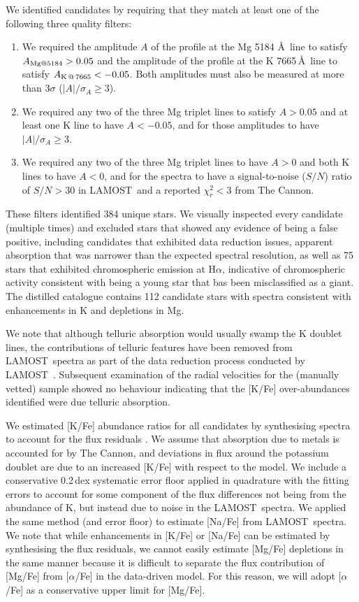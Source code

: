 \documentclass[a4paper,fleqn,usenatbib]{mnras}
\newcommand{\project}[1]{#1}
\newcommand{\lamost}{\project{LAMOST}}
\newcommand{\tc}{\project{The Cannon}}
\begin{document}
We identified candidates by requiring that they match at least one of the following three quality filters:
\begin{enumerate}
\item We required the amplitude $A$ of the profile at the Mg 5184 \AA \ line to satisfy $A_{{\rm Mg} @ 5184} > 0.05$ and the amplitude of the profile at the K 7665\,\AA\ line to satisfy $A_{{\rm K}\,@\,7665} < -0.05$. Both amplitudes must also be measured at more than $3\sigma$ ($|A|/\sigma_{A} \geq 3$).
\item We required any two of the three Mg triplet lines to satisfy $A > 0.05$ and at least one K line to have $A < -0.05$, and for those amplitudes to have $|A|/\sigma_{A} \geq 3$.
\item We required any two of the three Mg triplet lines to have $A > 0$ and both K lines to have $A < 0$, and for the spectra to have a signal-to-noise ($S/N$) ratio of $S/N > 30$ in \lamost\ and a reported $\chi_{r}^2 < 3$ from \tc \citep{ho2017,ness2016}.
\end{enumerate} 
 
These filters identified 384 unique stars. We visually inspected every candidate (multiple times) and excluded stars that showed any evidence of being a false positive, including candidates that exhibited data reduction issues, apparent absorption that was narrower than the expected spectral resolution, as well as 75 stars that exhibited chromospheric emission at H$\alpha$, indicative of chromospheric activity consistent with being a young star that bas been misclassified as a giant. The distilled catalogue contains 112 candidate stars with spectra consistent with enhancements in K and depletions in Mg.

We note that although telluric absorption would usually swamp the K doublet lines, the contributions of telluric features have been removed from \lamost\ spectra as part of the data reduction process conducted by \lamost\ \citep{luo2016vizier}. Subsequent examination of the radial velocities for the (manually vetted) sample showed no behaviour indicating that the [K/Fe] over-abundances identified were due telluric absorption.

We estimated [K/Fe] abundance ratios for all candidates by synthesising spectra to account for the flux residuals \citep{marcs,sme,vald,ispec}. We assume that absorption due to metals is accounted for by \tc, and deviations in flux around the potassium doublet are due to an increased [K/Fe] with respect to the model. We include a conservative 0.2\,dex systematic error floor applied in quadrature with the fitting errors to account for some component of the flux differences not being from the abundance of K, but instead due to noise in the \lamost\ spectra. We applied the same method (and error floor) to estimate [Na/Fe] from \lamost\ spectra. We note that while enhancements in [K/Fe] or [Na/Fe] can be estimated by synthesising the flux residuals, we cannot easily estimate [Mg/Fe] depletions in the same manner because it is difficult to separate the flux contribution of [Mg/Fe] from [$\alpha$/Fe] in the data-driven model. For this reason, we will adopt [$\alpha$/Fe] as a conservative upper limit for [Mg/Fe].
\end{document}
